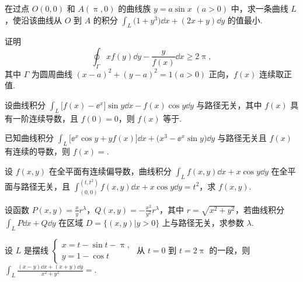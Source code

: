 	\begin{ti}
		在过点 $O(0,0)$ 和 $A(\uppi,0)$ 的曲线族 $y = a \sin x$ $(a > 0)$ 中，求一条曲线 $L$，使沿该曲线从 $O$ 到 $A$ 的积分 $\int_{L} \bigl( 1 + y^{3} \bigr) \dd{x} + (2x + y) \dd{y}$ 的值最小.
	\end{ti}

	\begin{ti}
		证明
		\[
			\oint_{\varGamma} x f(y) \dd{y} - \frac{y}{f(x)} \dd{x} \geq 2\uppi,
		\]
		其中 $\varGamma$ 为圆周曲线 $(x - a)^{2} + (y - a)^{2} = 1 (a > 0)$ 正向，$f(x)$ 连续取正值.
	\end{ti}

	\begin{ti}
		设曲线积分 $\int_{L} \bigl[ f(x) - \ee^{x} \bigr] \sin y \dd{x} - f(x) \cos y \dd{y}$ 与路径无关，其中 $f(x)$ 具有一阶连续导数，且 $f(0) = 0$，则 $f(x)$ 等于\kuo.

	\end{ti}

	\begin{ti}
		已知曲线积分 $\int_{L} \bigl[ \ee^{x} \cos y + y f(x) \bigr] \dd{x} + \bigl( x^{3} - \ee^{x} \sin y \bigr) \dd{y}$ 与路径无关且 $f(x)$ 有连续的导数，则 $f(x) = $\htwo.
	\end{ti}

	\begin{ti}
		设 $f(x,y)$ 在全平面有连续偏导数，曲线积分 $\int_{L} f(x,y) \dd{x} + x \cos y \dd{y}$ 在全平面与路径无关，且 $\int_{(0,0)}^{\left(t,t^{2}\right)} f(x,y) \dd{x} + x \cos y \dd{y} = t^{2}$，求 $f(x,y)$.
	\end{ti}

	\begin{ti}
		设函数 $P(x,y) = \frac{x}{y}r^{\lambda}$，$Q(x,y) = - \frac{x^{2}}{y^{2}}r^{\lambda}$，其中 $r = \sqrt{x^{2} + y^{2}}$，若曲线积分 $\int_{L} P \dd{x} + Q \dd{y}$ 在区域 $D = \bigl\{ (x,y) \bigl| y > 0 \bigr\}$ 上与路径无关，求参数 $\lambda$.
	\end{ti}

	\begin{ti}
		设 $L$ 是摆线 $\begin{cases}
			x = t - \sin t - \uppi,\\
			y = 1 - \cos t
		\end{cases}$ 从 $t = 0$ 到 $t = 2\uppi$ 的一段，则 $\int_{L} \frac{(x - y)\dd{x} + (x + y) \dd{y}}{x^{2} + y^{2}} = $\kuo.
		
		\fourch{$-\uppi$}{$\uppi$}{$2\uppi$}{$-2\uppi$}
	\end{ti}

